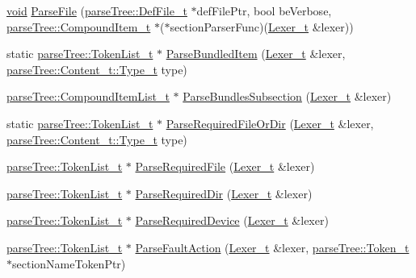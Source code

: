 \begin{DoxyCompactItemize}
\item 
\hyperlink{_t_e_m_p_l_a_t_e__cdef_8h_ac9c84fa68bbad002983e35ce3663c686}{void} \hyperlink{namespaceparser_ae59abbae57ecbcc5c7e352800544d3a3}{Parse\+File} (\hyperlink{structparse_tree_1_1_def_file__t}{parse\+Tree\+::\+Def\+File\+\_\+t} $\ast$def\+File\+Ptr, bool be\+Verbose, \hyperlink{structparse_tree_1_1_compound_item__t}{parse\+Tree\+::\+Compound\+Item\+\_\+t} $\ast$($\ast$section\+Parser\+Func)(\hyperlink{classparser_1_1_lexer__t}{Lexer\+\_\+t} \&lexer))
\item 
static \hyperlink{structparse_tree_1_1_token_list__t}{parse\+Tree\+::\+Token\+List\+\_\+t} $\ast$ \hyperlink{namespaceparser_ac1d4bebd5cc509eda1c01c1a43fc1cd2}{Parse\+Bundled\+Item} (\hyperlink{classparser_1_1_lexer__t}{Lexer\+\_\+t} \&lexer, \hyperlink{structparse_tree_1_1_content__t_a45cc4a193beac87a2045a2f6b6870d1b}{parse\+Tree\+::\+Content\+\_\+t\+::\+Type\+\_\+t} type)
\item 
\hyperlink{structparse_tree_1_1_compound_item_list__t}{parse\+Tree\+::\+Compound\+Item\+List\+\_\+t} $\ast$ \hyperlink{namespaceparser_a2cdae7f90d69c84f37fcb16361f829a3}{Parse\+Bundles\+Subsection} (\hyperlink{classparser_1_1_lexer__t}{Lexer\+\_\+t} \&lexer)
\item 
static \hyperlink{structparse_tree_1_1_token_list__t}{parse\+Tree\+::\+Token\+List\+\_\+t} $\ast$ \hyperlink{namespaceparser_a95a943f717a19933647457733e8ce9dd}{Parse\+Required\+File\+Or\+Dir} (\hyperlink{classparser_1_1_lexer__t}{Lexer\+\_\+t} \&lexer, \hyperlink{structparse_tree_1_1_content__t_a45cc4a193beac87a2045a2f6b6870d1b}{parse\+Tree\+::\+Content\+\_\+t\+::\+Type\+\_\+t} type)
\item 
\hyperlink{structparse_tree_1_1_token_list__t}{parse\+Tree\+::\+Token\+List\+\_\+t} $\ast$ \hyperlink{namespaceparser_abe57e1b1418f58518e54ec377cebdc64}{Parse\+Required\+File} (\hyperlink{classparser_1_1_lexer__t}{Lexer\+\_\+t} \&lexer)
\item 
\hyperlink{structparse_tree_1_1_token_list__t}{parse\+Tree\+::\+Token\+List\+\_\+t} $\ast$ \hyperlink{namespaceparser_a9065aea193e8b56617939bcc4d3fb628}{Parse\+Required\+Dir} (\hyperlink{classparser_1_1_lexer__t}{Lexer\+\_\+t} \&lexer)
\item 
\hyperlink{structparse_tree_1_1_token_list__t}{parse\+Tree\+::\+Token\+List\+\_\+t} $\ast$ \hyperlink{namespaceparser_a61b2e4110a793213ad894bc20e9d4b2a}{Parse\+Required\+Device} (\hyperlink{classparser_1_1_lexer__t}{Lexer\+\_\+t} \&lexer)
\item 
\hyperlink{structparse_tree_1_1_token_list__t}{parse\+Tree\+::\+Token\+List\+\_\+t} $\ast$ \hyperlink{namespaceparser_a6d6da21ee31b5d19cfce6e3661033aa6}{Parse\+Fault\+Action} (\hyperlink{classparser_1_1_lexer__t}{Lexer\+\_\+t} \&lexer, \hyperlink{structparse_tree_1_1_token__t}{parse\+Tree\+::\+Token\+\_\+t} $\ast$section\+Name\+Token\+Ptr)

\end{DoxyCompactItemize}
